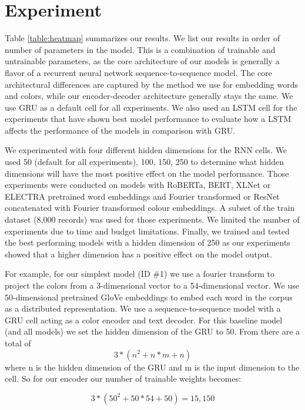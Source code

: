 \section{Experiment}

Table \ref{table:heatmap} summarizes our results. We list our results in order of number of parameters in the model. This is a combination of trainable and untrainable parameters, as the core architecture of our models is generally a flavor of a recurrent neural network sequence-to-sequence model. The core architectural differences are captured by the method we use for embedding words and colors, while our encoder-decoder architecture generally stays the same. We use GRU as a default cell for all experiments. We also used an LSTM cell for the experiments that have shown best model performance to evaluate how a LSTM affects the performance of the models in comparison with GRU.

\par
We experimented with four different hidden dimensions for the RNN cells. We used 50 (default for all experiments), 100, 150, 250 to determine what hidden dimensions will have the most positive effect on the model performance. Those experiments were conducted on models with RoBERTa, BERT, XLNet or ELECTRA pretrained word embeddings and Fourier transformed or ResNet concatenated with Fourier transformed colour embeddings. A subset of the train dataset (8,000 records) was used for those experiments. We limited the number of experiments due to time and budget limitations. Finally, we trained and tested the best performing models with a hidden dimension of 250 as our experiments showed that a higher dimension has a positive effect on the model output.

\par
For example, for our simplest model (ID \#1) we use a fourier transform to project the colors from a 3-dimensional vector to a 54-dimensional vector. We use 50-dimensional pretrained GloVe embeddings to embed each word in the corpus as a distributed representation. We use a sequence-to-sequence model with a GRU cell acting as a color encoder and text decoder. For this baseline model (and all models) we set the hidden dimension of the GRU to 50. From \citep{dey-2017-gru} there are a total of \[3*(n^2 + n*m +n)\] where n is the hidden dimension of the GRU and m is the input dimension to the cell. So for our encoder our number of trainable weights becomes:

\[3*(50^2 + 50*54 +50) = 15,150\]


